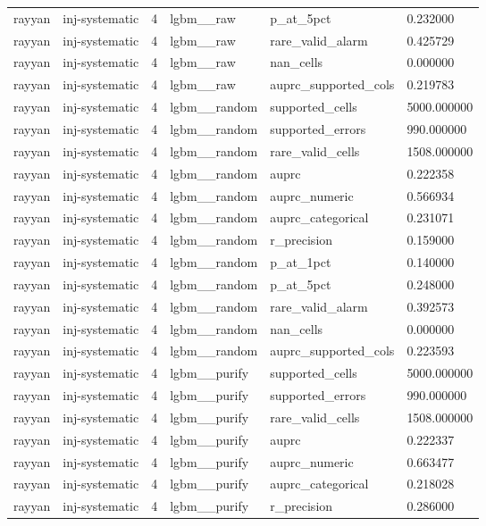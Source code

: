 \begin{tabular}{llllll}
rayyan & inj-systematic & 4 & lgbm\_\_raw & p\_at\_5pct & 0.232000 \\
rayyan & inj-systematic & 4 & lgbm\_\_raw & rare\_valid\_alarm & 0.425729 \\
rayyan & inj-systematic & 4 & lgbm\_\_raw & nan\_cells & 0.000000 \\
rayyan & inj-systematic & 4 & lgbm\_\_raw & auprc\_supported\_cols & 0.219783 \\
rayyan & inj-systematic & 4 & lgbm\_\_random & supported\_cells & 5000.000000 \\
rayyan & inj-systematic & 4 & lgbm\_\_random & supported\_errors & 990.000000 \\
rayyan & inj-systematic & 4 & lgbm\_\_random & rare\_valid\_cells & 1508.000000 \\
rayyan & inj-systematic & 4 & lgbm\_\_random & auprc & 0.222358 \\
rayyan & inj-systematic & 4 & lgbm\_\_random & auprc\_numeric & 0.566934 \\
rayyan & inj-systematic & 4 & lgbm\_\_random & auprc\_categorical & 0.231071 \\
rayyan & inj-systematic & 4 & lgbm\_\_random & r\_precision & 0.159000 \\
rayyan & inj-systematic & 4 & lgbm\_\_random & p\_at\_1pct & 0.140000 \\
rayyan & inj-systematic & 4 & lgbm\_\_random & p\_at\_5pct & 0.248000 \\
rayyan & inj-systematic & 4 & lgbm\_\_random & rare\_valid\_alarm & 0.392573 \\
rayyan & inj-systematic & 4 & lgbm\_\_random & nan\_cells & 0.000000 \\
rayyan & inj-systematic & 4 & lgbm\_\_random & auprc\_supported\_cols & 0.223593 \\
rayyan & inj-systematic & 4 & lgbm\_\_purify & supported\_cells & 5000.000000 \\
rayyan & inj-systematic & 4 & lgbm\_\_purify & supported\_errors & 990.000000 \\
rayyan & inj-systematic & 4 & lgbm\_\_purify & rare\_valid\_cells & 1508.000000 \\
rayyan & inj-systematic & 4 & lgbm\_\_purify & auprc & 0.222337 \\
rayyan & inj-systematic & 4 & lgbm\_\_purify & auprc\_numeric & 0.663477 \\
rayyan & inj-systematic & 4 & lgbm\_\_purify & auprc\_categorical & 0.218028 \\
rayyan & inj-systematic & 4 & lgbm\_\_purify & r\_precision & 0.286000 \\

\end{tabular}
